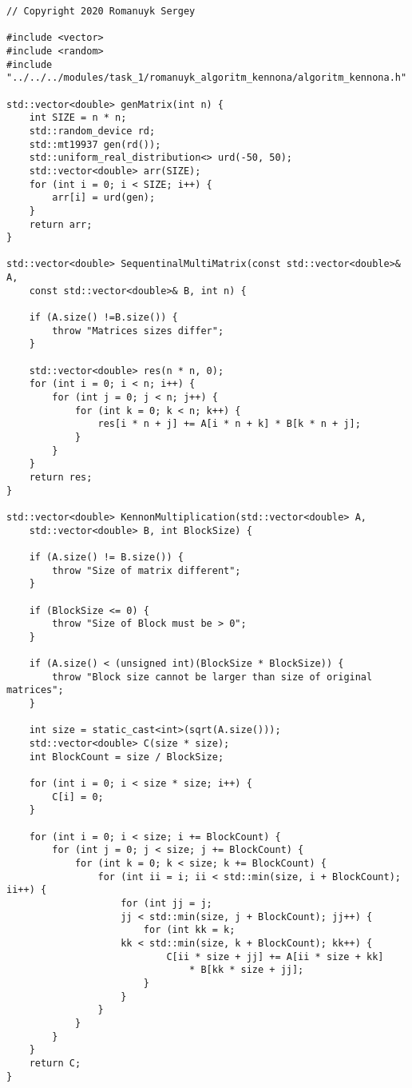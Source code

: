 \documentclass{report}
\begin{document}
\begin{lstlisting}
// Copyright 2020 Romanuyk Sergey

#include <vector>
#include <random>
#include "../../../modules/task_1/romanuyk_algoritm_kennona/algoritm_kennona.h"

std::vector<double> genMatrix(int n) {
    int SIZE = n * n;
    std::random_device rd;
    std::mt19937 gen(rd());
    std::uniform_real_distribution<> urd(-50, 50);
    std::vector<double> arr(SIZE);
    for (int i = 0; i < SIZE; i++) {
        arr[i] = urd(gen);
    }
    return arr;
}

std::vector<double> SequentinalMultiMatrix(const std::vector<double>& A,
    const std::vector<double>& B, int n) {

    if (A.size() !=B.size()) {
        throw "Matrices sizes differ";
    }

    std::vector<double> res(n * n, 0);
    for (int i = 0; i < n; i++) {
        for (int j = 0; j < n; j++) {
            for (int k = 0; k < n; k++) {
                res[i * n + j] += A[i * n + k] * B[k * n + j];
            }
        }
    }
    return res;
}

std::vector<double> KennonMultiplication(std::vector<double> A,
    std::vector<double> B, int BlockSize) {

    if (A.size() != B.size()) {
        throw "Size of matrix different";
    }

    if (BlockSize <= 0) {
        throw "Size of Block must be > 0";
    }

    if (A.size() < (unsigned int)(BlockSize * BlockSize)) {
        throw "Block size cannot be larger than size of original matrices";
    }

    int size = static_cast<int>(sqrt(A.size()));
    std::vector<double> C(size * size);
    int BlockCount = size / BlockSize;

    for (int i = 0; i < size * size; i++) {
        C[i] = 0;
    }

    for (int i = 0; i < size; i += BlockCount) {
        for (int j = 0; j < size; j += BlockCount) {
            for (int k = 0; k < size; k += BlockCount) {
                for (int ii = i; ii < std::min(size, i + BlockCount); ii++) {
                    for (int jj = j;
                    jj < std::min(size, j + BlockCount); jj++) {
                        for (int kk = k;
                    kk < std::min(size, k + BlockCount); kk++) {
                            C[ii * size + jj] += A[ii * size + kk]
                                * B[kk * size + jj];
                        }
                    }
                }
            }
        }
    }
    return C;
}
\end{lstlisting}
\end{document}
